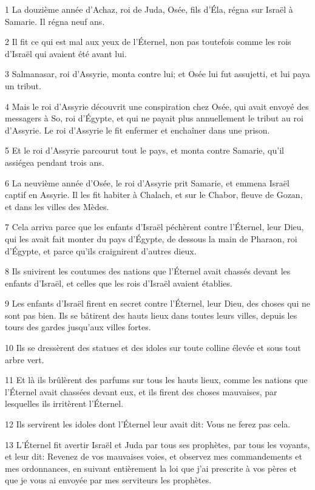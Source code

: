 \par 1 La douzième année d'Achaz, roi de Juda, Osée, fils d'Éla, régna sur Israël à Samarie. Il régna neuf ans.
\par 2 Il fit ce qui est mal aux yeux de l'Éternel, non pas toutefois comme les rois d'Israël qui avaient été avant lui.
\par 3 Salmanasar, roi d'Assyrie, monta contre lui; et Osée lui fut assujetti, et lui paya un tribut.
\par 4 Mais le roi d'Assyrie découvrit une conspiration chez Osée, qui avait envoyé des messagers à So, roi d'Égypte, et qui ne payait plus annuellement le tribut au roi d'Assyrie. Le roi d'Assyrie le fit enfermer et enchaîner dans une prison.
\par 5 Et le roi d'Assyrie parcourut tout le pays, et monta contre Samarie, qu'il assiégea pendant trois ans.
\par 6 La neuvième année d'Osée, le roi d'Assyrie prit Samarie, et emmena Israël captif en Assyrie. Il les fit habiter à Chalach, et sur le Chabor, fleuve de Gozan, et dans les villes des Mèdes.
\par 7 Cela arriva parce que les enfants d'Israël péchèrent contre l'Éternel, leur Dieu, qui les avait fait monter du pays d'Égypte, de dessous la main de Pharaon, roi d'Égypte, et parce qu'ils craignirent d'autres dieux.
\par 8 Ils suivirent les coutumes des nations que l'Éternel avait chassés devant les enfants d'Israël, et celles que les rois d'Israël avaient établies.
\par 9 Les enfants d'Israël firent en secret contre l'Éternel, leur Dieu, des choses qui ne sont pas bien. Ils se bâtirent des hauts lieux dans toutes leurs villes, depuis les tours des gardes jusqu'aux villes fortes.
\par 10 Ils se dressèrent des statues et des idoles sur toute colline élevée et sous tout arbre vert.
\par 11 Et là ils brûlèrent des parfums sur tous les hauts lieux, comme les nations que l'Éternel avait chassées devant eux, et ils firent des choses mauvaises, par lesquelles ils irritèrent l'Éternel.
\par 12 Ils servirent les idoles dont l'Éternel leur avait dit: Vous ne ferez pas cela.
\par 13 L'Éternel fit avertir Israël et Juda par tous ses prophètes, par tous les voyants, et leur dit: Revenez de vos mauvaises voies, et observez mes commandements et mes ordonnances, en suivant entièrement la loi que j'ai prescrite à vos pères et que je vous ai envoyée par mes serviteurs les prophètes.
